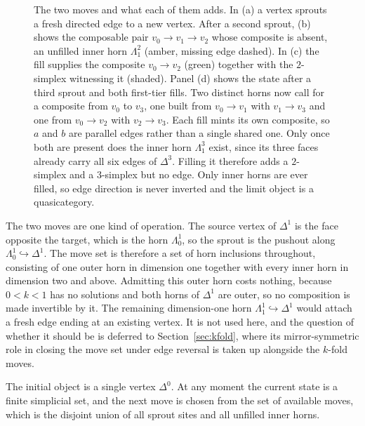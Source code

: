 \begin{figure}[H]
  \centering
  
  \caption{The two moves and what each of them adds. In (a) a vertex
  sprouts a fresh directed edge to a new vertex. After a second sprout,
  (b) shows the composable pair $v_0 \to v_1 \to v_2$ whose composite is
  absent, an unfilled inner horn $\Lambda^2_1$ (amber, missing edge
  dashed). In (c) the fill supplies the composite $v_0 \to v_2$ (green)
  together with the $2$-simplex witnessing it (shaded). Panel (d) shows the
  state after a third sprout and both first-tier fills. Two distinct
  horns now call for a composite from $v_0$ to $v_3$, one built from
  $v_0 \to v_1$ with $v_1 \to v_3$ and one from $v_0 \to v_2$ with
  $v_2 \to v_3$. Each fill mints its own composite, so $a$ and $b$ are
  parallel edges rather than a single shared one. Only once both are
  present does the inner horn $\Lambda^3_1$ exist, since its three faces
  already carry all six edges of $\Delta^3$. Filling it therefore adds a
  $2$-simplex and a $3$-simplex but no edge. Only inner horns are ever filled,
  so edge direction is never inverted and the limit object is a
  quasicategory.}
  \label{fig:sprout-fill}
\end{figure}

\begin{remark}
\label{rem:sproutishorn}
The two moves are one kind of operation.
The source vertex of $\Delta^1$ is the face opposite the target, which is the horn $\Lambda^1_0$, so the sprout is the pushout along $\Lambda^1_0 \hookrightarrow \Delta^1$.
The move set is therefore a set of horn inclusions throughout, consisting of one outer horn in dimension one together with every inner horn in dimension two and above.
Admitting this outer horn costs nothing, because $0 < k < 1$ has no solutions and both horns of $\Delta^1$ are outer, so no composition is made invertible by it.
The remaining dimension-one horn $\Lambda^1_1 \hookrightarrow \Delta^1$ would attach a fresh edge ending at an existing vertex.
It is not used here, and the question of whether it should be is deferred to Section~\ref{sec:kfold}, where its mirror-symmetric role in closing the move set under edge reversal is taken up alongside the $k$-fold moves.
\end{remark}

The initial object is a single vertex $\Delta^0$. At any moment the current state is a finite simplicial set, and the next move is chosen from the set of available moves, which is the disjoint union of all sprout sites and all unfilled inner horns.

